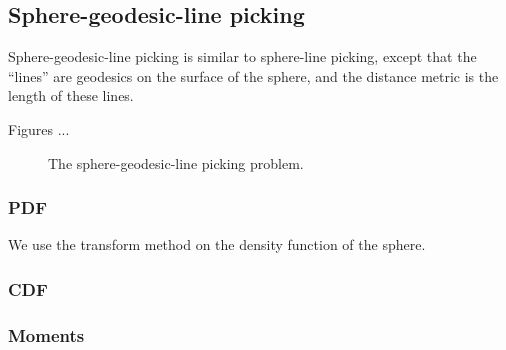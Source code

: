 \subsection{Sphere-geodesic-line picking}
\label{sec:sphere_geodesic_line}


Sphere-geodesic-line picking is similar to sphere-line picking, except
that the ``lines'' are geodesics on the surface of the sphere, and the
distance metric is the length of these lines.

Figures ...

\begin{figure}[tbp]
  \begin{center}
    \hspace{6mm}
    \caption{The sphere-geodesic-line picking problem.}
  \end{center} 
\vspace{-4mm}
\end{figure}

\subsubsection{PDF}

We use the transform method on the density function of the sphere. 

\subsubsection{CDF}

\subsubsection{Moments}



